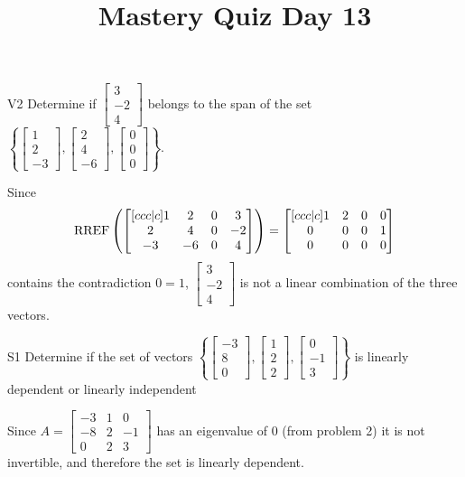\documentclass{sbgLAquiz}
\title{Mastery Quiz Day 13 }
\begin{document}
\begin{problem}{V2}
  Determine if
  \(\begin{bmatrix} 3 \\ -2 \\ 4 \end{bmatrix}\)
  belongs to the span of the set
  \(\left\{
    \begin{bmatrix} 1 \\ 2 \\ -3 \end{bmatrix},
    \begin{bmatrix} 2 \\ 4 \\ -6 \end{bmatrix},
    \begin{bmatrix} 0 \\ 0 \\ 0 \end{bmatrix}
    \right\}
  \).
\end{problem}
\begin{solution}
  Since
  \[
    \operatorname{RREF}\left(
      \begin{bmatrix}[ccc|c]
        1 & 2 & 0 & 3 \\
        2 & 4 & 0 & -2 \\
        -3 & -6 & 0 & 4
      \end{bmatrix}
    \right) =
    \begin{bmatrix}[ccc|c]
      1 & 2 & 0 & 0 \\
      0 & 0 & 0 & 1 \\
      0 & 0 & 0 & 0
    \end{bmatrix}
  \]
  contains the contradiction \(0=1\),
  \(\begin{bmatrix} 3 \\ -2 \\ 4 \end{bmatrix}\) is
  not a linear combination of the three vectors.
\end{solution}
\begin{problem}{S1}
Determine if the set of vectors $\left\{ \begin{bmatrix} -3 \\ 8 \\ 0 \end{bmatrix}, \begin{bmatrix} 1 \\ 2 \\ 2 \end{bmatrix}, \begin{bmatrix} 0 \\ -1 \\ 3 \end{bmatrix} \right\}$ is  linearly dependent or linearly independent
\end{problem}
\begin{solution}
Since $A= \begin{bmatrix}-3 & 1 & 0 \\ -8 & 2 & -1 \\ 0 & 2 & 3\end{bmatrix}$ has an eigenvalue of $0$ (from problem 2) it is not invertible, and therefore the set is linearly dependent.
\end{solution}
\end{document}
